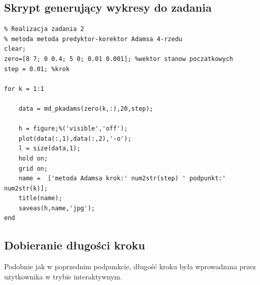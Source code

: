 \documentclass[a4paper, 12pt]{article}
\begin{document}
\subsection{Skrypt generujący wykresy do zadania}
\begin{lstlisting}
% Realizacja zadania 2 
% metoda metoda predyktor-korektor Adamsa 4-rzedu
clear; 
zero=[8 7; 0 0.4; 5 0; 0.01 0.001]; %wektor stanow poczatkowych
step = 0.01; %krok

for k = 1:1
    
    data = md_pkadams(zero(k,:),20,step);
   
    h = figure;%('visible','off');
    plot(data(:,1),data(:,2),'-o');
    l = size(data,1);
    hold on;
    grid on; 
    name =  ['metoda Adamsa krok:' num2str(step) ' podpunkt:' num2str(k)];
    title(name);
    saveas(h,name,'jpg'); 
end
\end{lstlisting}

\subsection{Dobieranie długości kroku}
Podobnie jak w poprzednim podpunkcie, długość kroku była wprowadzana przez użytkownika w trybie interaktywnym. 
\end{document}
